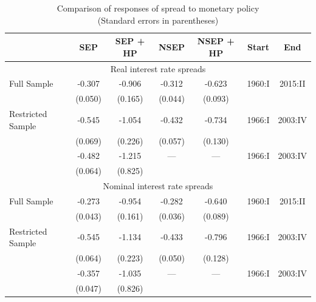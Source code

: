 \begin{table}[p!]
\centering
\captionsetup{singlelinecheck=false, justification=centering}
\caption{Comparison of responses of spread to monetary policy \\ (Standard errors in parentheses)}
\label{spread-comparison-nipa}
\begin{tabular}{lcccccc} \hline
                   & SEP     & SEP + HP & NSEP    & NSEP + HP & Start  & End \\ \hline
\multicolumn{7}{c}{Real interest rate spreads} \\ \hline
Full Sample        & -0.307  & -0.906   & -0.312  & -0.623    & 1960:I & 2015:II \\
                   & (0.050) & (0.165)  & (0.044) & (0.093) \\
Restricted Sample  & -0.545  & -1.054   & -0.432  & -0.734    & 1966:I & 2003:IV \\
                   & (0.069) & (0.226)  & (0.057) & (0.130) \\
\cite{canzoneri07} & -0.482  & -1.215   & ---     & ---       & 1966:I & 2003:IV \\ 
                   & (0.064) & (0.825) \\\hline
\multicolumn{7}{c}{Nominal interest rate spreads} \\ \hline
Full Sample        & -0.273  & -0.954   & -0.282  & -0.640    & 1960:I & 2015:II \\
                   & (0.043) & (0.161)  & (0.036) & (0.089) \\
Restricted Sample  & -0.545  & -1.134   & -0.433  & -0.796    & 1966:I & 2003:IV \\
                   & (0.064) & (0.223)  & (0.050) & (0.128) \\
\cite{canzoneri07} & -0.357  & -1.035   & ---   & ---       & 1966:I & 2003:IV \\ 
                   & (0.047) & (0.826) \\\hline
\end{tabular}
\end{table}




